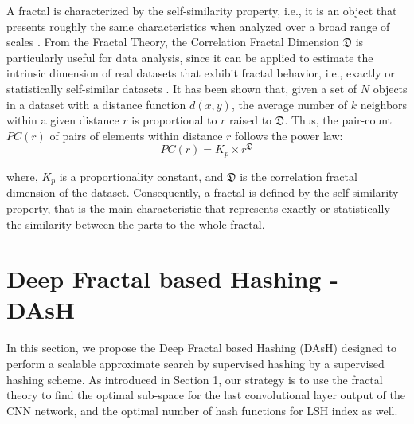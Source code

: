 \documentclass[conference]{IEEEtran}
\begin{document}

 
A fractal is characterized by the self-similarity property, i.e., it is an object that presents roughly the same characteristics when analyzed over a broad range of scales \cite{DBLP:journals/jidm/TrainaTWF10}. From the Fractal Theory, the Correlation Fractal Dimension $\mathfrak{D}$ is particularly useful for data analysis, since it can be applied to estimate the intrinsic dimension of real datasets that exhibit fractal behavior, i.e., exactly or statistically self-similar datasets \cite{DBLP:fractal2016}.   It has been shown that, given a set of $N$ objects in a dataset with a distance function $d(x,y)$, the average number of $k$ neighbors within a given distance $r$ is proportional to $r$ raised to $\mathfrak{D}$. Thus, the pair-count $PC(r)$ of pairs of elements within distance $r$ follows the power law:
\begin{equation}\label{eq:fractal}
	   PC(r) = K_p \times r^{\mathfrak{D}}		
	\end{equation}

     where, $K_p$ is a proportionality constant, and $\mathfrak{D}$ is the correlation fractal dimension of the dataset. 
    Consequently, a fractal is defined by the self-similarity property, that is the main characteristic that represents exactly or statistically  the similarity between the parts to the whole fractal.  
 

\section{Deep Fractal based  Hashing - DAsH}

In this section, we propose the Deep Fractal based  Hashing (DAsH) designed to perform a scalable approximate search by supervised hashing by a supervised hashing scheme. As introduced in Section 1, our strategy is to use the fractal theory to find the optimal sub-space for the last convolutional layer output of the CNN network, and the optimal number of hash functions for LSH index as well. 
\end{document}
